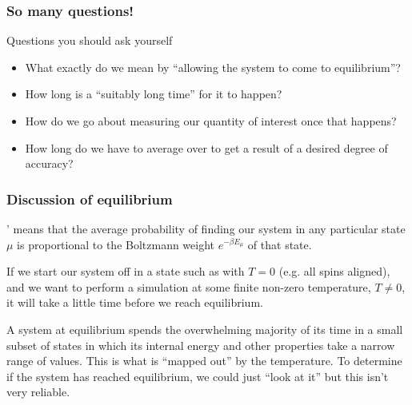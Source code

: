 \documentclass[hyperref={colorlinks=true}]{beamer}
\begin{document}
\begin{frame}%
  \frametitle{So many questions!}
  
  \begin{ucblock}{Questions you should ask yourself}
    \begin{itemize}
      \item What exactly do we mean by ``allowing the system to come to equilibrium''? 
      \item How long is a ``suitably long time'' for it to happen? 
      \item How do we go about measuring our quantity of interest once that happens?
      \item How long do we have to average over to get a result of a desired degree of accuracy?
    \end{itemize}
  \end{ucblock}
  
  \vspace{0.3cm}
  
  \centering {}

\end{frame}


\begin{frame}%
  \frametitle{Discussion of equilibrium}
 
  ' means that the average probability of finding our system in any particular state $\mu$ is proportional to the Boltzmann weight $e^{-\beta E_{\mu}}$ of that state.
  
  \vspace{0.3cm}

  If we start our system off in a state such as with $T = 0$ (e.g. all spins aligned), and we want to perform a simulation at some finite non-zero temperature, $T\neq0$, it will take a little time before we reach equilibrium.
  
  \vspace{0.3cm}

A system at equilibrium spends the overwhelming majority of its time in a small subset of states in which its internal energy and other properties take a narrow range of values. This is what is ``mapped out'' by the temperature. To determine if the system has reached equilibrium, we could just ``look at it'' but this isn't very reliable. 

\end{frame}
\end{document}
